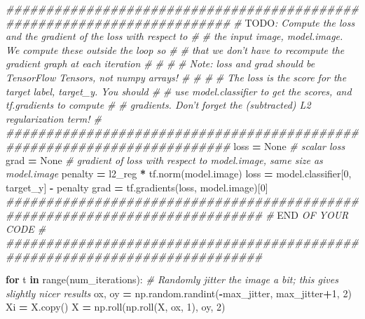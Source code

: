 \documentclass[]{book}
\newenvironment{Shaded}{\begin{snugshade}}{\end{snugshade}}
\newcommand{\KeywordTok}[1]{\textcolor[rgb]{0.13,0.29,0.53}{\textbf{#1}}}
\newcommand{\DecValTok}[1]{\textcolor[rgb]{0.00,0.00,0.81}{#1}}
\newcommand{\CommentTok}[1]{\textcolor[rgb]{0.56,0.35,0.01}{\textit{#1}}}
\newcommand{\VariableTok}[1]{\textcolor[rgb]{0.00,0.00,0.00}{#1}}
\newcommand{\ControlFlowTok}[1]{\textcolor[rgb]{0.13,0.29,0.53}{\textbf{#1}}}
\newcommand{\OperatorTok}[1]{\textcolor[rgb]{0.81,0.36,0.00}{\textbf{#1}}}
\newcommand{\BuiltInTok}[1]{#1}
\newcommand{\RegionMarkerTok}[1]{#1}
\newcommand{\AlertTok}[1]{\textcolor[rgb]{0.94,0.16,0.16}{#1}}
\newcommand{\NormalTok}[1]{#1}
\theoremstyle{definition}
\theoremstyle{definition}
\theoremstyle{definition}
\theoremstyle{remark}
\begin{document}
\begin{Shaded}
\begin{Highlighting}[]
    \CommentTok{########################################################################}
    \CommentTok{# }\AlertTok{TODO}\CommentTok{: Compute the loss and the gradient of the loss with respect to  #}
    \CommentTok{# the input image, model.image. We compute these outside the loop so   #}
    \CommentTok{# that we don't have to recompute the gradient graph at each iteration #}
    \CommentTok{#                                                                      #}
    \CommentTok{# Note: loss and grad should be TensorFlow Tensors, not numpy arrays!  #}
    \CommentTok{#                                                                      #}
    \CommentTok{# The loss is the score for the target label, target_y. You should     #}
    \CommentTok{# use model.classifier to get the scores, and tf.gradients to compute  #}
    \CommentTok{# gradients. Don't forget the (subtracted) L2 regularization term!     #}
    \CommentTok{########################################################################}
\NormalTok{    loss }\OperatorTok{=} \VariableTok{None} \CommentTok{# scalar loss}
\NormalTok{    grad }\OperatorTok{=} \VariableTok{None} \CommentTok{# gradient of loss with respect to model.image, same size as model.image}
\NormalTok{    penalty }\OperatorTok{=}\NormalTok{ l2_reg }\OperatorTok{*}\NormalTok{ tf.norm(model.image)}
\NormalTok{    loss }\OperatorTok{=}\NormalTok{ model.classifier[}\DecValTok{0}\NormalTok{, target_y] }\OperatorTok{-}\NormalTok{ penalty}
\NormalTok{    grad }\OperatorTok{=}\NormalTok{ tf.gradients(loss, model.image)[}\DecValTok{0}\NormalTok{]}
    \CommentTok{############################################################################}
    \CommentTok{#                             }\RegionMarkerTok{END}\CommentTok{ OF YOUR CODE                             #}
    \CommentTok{############################################################################}

    
    \ControlFlowTok{for}\NormalTok{ t }\KeywordTok{in} \BuiltInTok{range}\NormalTok{(num_iterations):}
        \CommentTok{# Randomly jitter the image a bit; this gives slightly nicer results}
\NormalTok{        ox, oy }\OperatorTok{=}\NormalTok{ np.random.randint(}\OperatorTok{-}\NormalTok{max_jitter, max_jitter}\OperatorTok{+}\DecValTok{1}\NormalTok{, }\DecValTok{2}\NormalTok{)}
\NormalTok{        Xi }\OperatorTok{=}\NormalTok{ X.copy()}
\NormalTok{        X }\OperatorTok{=}\NormalTok{ np.roll(np.roll(X, ox, }\DecValTok{1}\NormalTok{), oy, }\DecValTok{2}\NormalTok{)}
        

\end{Highlighting}
\end{Shaded}
\end{document}
